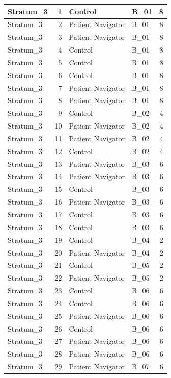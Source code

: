 \documentclass[
]{book}
\begin{document}
\begin{table}[H]
\begin{tabular}{l|r|l|l|r}
\hline
Stratum\_3 & 1 & Control & B\_01 & 8\\
\hline
Stratum\_3 & 2 & Patient Navigator & B\_01 & 8\\
\hline
Stratum\_3 & 3 & Patient Navigator & B\_01 & 8\\
\hline
Stratum\_3 & 4 & Control & B\_01 & 8\\
\hline
Stratum\_3 & 5 & Control & B\_01 & 8\\
\hline
Stratum\_3 & 6 & Control & B\_01 & 8\\
\hline
Stratum\_3 & 7 & Patient Navigator & B\_01 & 8\\
\hline
Stratum\_3 & 8 & Patient Navigator & B\_01 & 8\\
\hline
Stratum\_3 & 9 & Control & B\_02 & 4\\
\hline
Stratum\_3 & 10 & Patient Navigator & B\_02 & 4\\
\hline
Stratum\_3 & 11 & Patient Navigator & B\_02 & 4\\
\hline
Stratum\_3 & 12 & Control & B\_02 & 4\\
\hline
Stratum\_3 & 13 & Patient Navigator & B\_03 & 6\\
\hline
Stratum\_3 & 14 & Patient Navigator & B\_03 & 6\\
\hline
Stratum\_3 & 15 & Control & B\_03 & 6\\
\hline
Stratum\_3 & 16 & Patient Navigator & B\_03 & 6\\
\hline
Stratum\_3 & 17 & Control & B\_03 & 6\\
\hline
Stratum\_3 & 18 & Control & B\_03 & 6\\
\hline
Stratum\_3 & 19 & Control & B\_04 & 2\\
\hline
Stratum\_3 & 20 & Patient Navigator & B\_04 & 2\\
\hline
Stratum\_3 & 21 & Control & B\_05 & 2\\
\hline
Stratum\_3 & 22 & Patient Navigator & B\_05 & 2\\
\hline
Stratum\_3 & 23 & Control & B\_06 & 6\\
\hline
Stratum\_3 & 24 & Control & B\_06 & 6\\
\hline
Stratum\_3 & 25 & Patient Navigator & B\_06 & 6\\
\hline
Stratum\_3 & 26 & Control & B\_06 & 6\\
\hline
Stratum\_3 & 27 & Patient Navigator & B\_06 & 6\\
\hline
Stratum\_3 & 28 & Patient Navigator & B\_06 & 6\\
\hline
Stratum\_3 & 29 & Patient Navigator & B\_07 & 6\\

\end{tabular}
\end{table}
\end{document}
